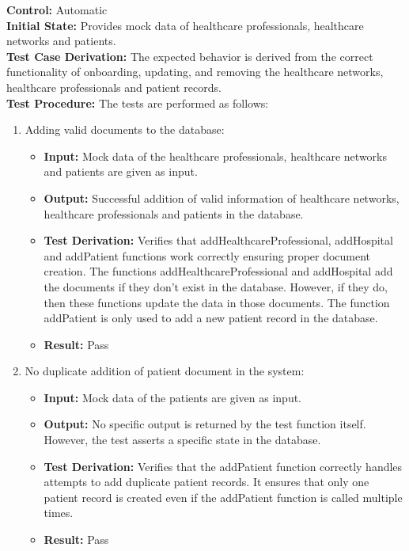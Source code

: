 \documentclass[12pt, titlepage]{article}
\begin{document}
  \textbf{Control:} Automatic\\
  \textbf{Initial State:} Provides mock data of healthcare professionals, healthcare networks and patients.\\
  \textbf{Test Case Derivation:} The expected behavior is derived from the correct functionality of onboarding, updating, and removing the healthcare networks, healthcare professionals and patient records.\\
  \textbf{Test Procedure:} The tests are performed as follows:
  \begin{enumerate}
    \item Adding valid documents to the database:
      \begin{itemize}
        \item \textbf{Input:} Mock data of the healthcare professionals, healthcare networks and patients are given as input.  
        \item \textbf{Output:} Successful addition of valid information of healthcare networks, healthcare professionals and patients in the database. 
        \item \textbf{Test Derivation:} Verifies that addHealthcareProfessional, addHospital and addPatient functions work correctly ensuring proper document creation. The functions addHealthcareProfessional and addHospital add the documents if they don't exist in the database. However, if they do, then these functions update the data in those documents. The function addPatient is only used to add a new patient record in the database.
        \item \textbf{Result:} Pass 
      \end{itemize}

    \item No duplicate addition of patient document in the system:
      \begin{itemize}
        \item \textbf{Input:} Mock data of the patients are given as input.  
        \item \textbf{Output:} No specific output is returned by the test function itself. However, the test asserts a specific state in the database. 
        \item \textbf{Test Derivation:} Verifies that the addPatient function correctly handles attempts to add duplicate patient records. It ensures that only one patient record is created even if the addPatient function is called multiple times.
        \item \textbf{Result:} Pass
      \end{itemize}


\end{enumerate}
\end{document}
